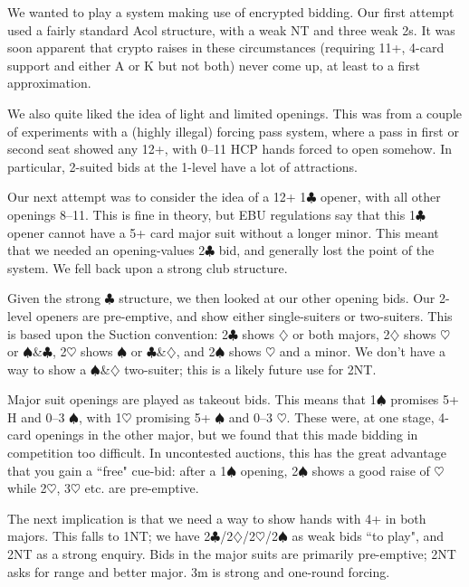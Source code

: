 \documentclass[a4paper,14pt]{extarticle}
\begin{document}
We wanted to play a system making use of encrypted bidding.  Our first attempt
used a fairly standard Acol structure, with a weak NT and three weak 2s.  It
was soon apparent that crypto raises in these circumstances (requiring 11+,
4-card support and either A or K but not both) never come up, at least to a
first approximation.

We also quite liked the idea of light and limited openings.  This was from a
couple of experiments with a (highly illegal) forcing pass system, where a pass
in first or second seat showed any 12+, with 0--11 HCP hands forced to open
somehow.  In particular, 2-suited bids at the 1-level have a lot of
attractions.

Our next attempt was to consider the idea of a 12+ 1$\clubsuit$ opener, with all other
openings 8--11.  This is fine in theory, but EBU regulations say that this 1$\clubsuit$
opener cannot have a 5+ card major suit without a longer minor.  This meant
that we needed an opening-values 2$\clubsuit$ bid, and generally lost the point of the
system.  We fell back upon a strong club structure.

Given the strong $\clubsuit$ structure, we then looked at our other opening bids.  Our
2-level openers are pre-emptive, and show either single-suiters or two-suiters.
This is based upon the Suction convention: 2$\clubsuit$ shows $\diamondsuit$ or both majors, 2$\diamondsuit$ shows
$\heartsuit$ or $\spadesuit$\&$\clubsuit$, 2$\heartsuit$ shows $\spadesuit$ or $\clubsuit$\&$\diamondsuit$, and 2$\spadesuit$ shows $\heartsuit$ and a minor.  We don't have a way
to show a $\spadesuit$\&$\diamondsuit$ two-suiter; this is a likely future use for 2NT.

Major suit openings are played as takeout bids.  This means that 1$\spadesuit$ promises 5+
H and 0--3 $\spadesuit$, with 1$\heartsuit$ promising 5+ $\spadesuit$ and 0--3 $\heartsuit$.  These were, at one stage,
4-card openings in the other major, but we found that this made bidding in
competition too difficult.  In uncontested auctions, this has the great
advantage that you gain a ``free" cue-bid: after a 1$\spadesuit$ opening, 2$\spadesuit$ shows a good
raise of $\heartsuit$ while 2$\heartsuit$, 3$\heartsuit$ etc. are pre-emptive.

The next implication is that we need a way to show hands with 4+ in both
majors.  This falls to 1NT; we have 2$\clubsuit$/2$\diamondsuit$/2$\heartsuit$/2$\spadesuit$ as weak bids ``to play", and 2NT
as a strong enquiry.  Bids in the major suits are primarily pre-emptive; 2NT
asks for range and better major.  3m is strong and one-round forcing.
\end{document}
